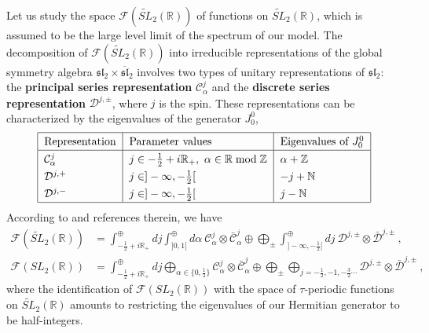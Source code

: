 \documentclass[12pt, a4paper, notitlepage, twoside]{report}
\numberwithin{equation}{section}
\theoremstyle{break}
\begin{document}
Let us study the space $\mathcal{F}(\widetilde{SL}_2(\mathbb{R}))$ of functions on $\widetilde{SL}_2(\mathbb{R})$, which is assumed to be the large level limit of the spectrum of our model. 
The decomposition of $\mathcal{F}(\widetilde{SL}_2(\mathbb{R}))$ into irreducible representations of the global symmetry algebra $\mathfrak{sl}_2\times \overline{\mathfrak{sl}}_2$ involves two types of unitary representations of $\mathfrak{sl}_2$: the \textbf{\boldmath principal series representation} $\mathcal{C}^j_\alpha$ and the \textbf{\boldmath discrete series representation} $\mathcal{D}^{j,\pm}$, where $j$ is the spin. 
These representations can be characterized by the eigenvalues of the generator $J_0^0$,
\begin{align} 
\renewcommand{\arraystretch}{1.3}
\begin{tabular}{|l|l|l|}
  \hline
Representation & Parameter values & Eigenvalues of $J_0^0$
\\
\hline 
$\mathcal{C}^j_\alpha$  & $j\in -\tfrac12+i{\mathbb{R}}_+,\ \alpha\in{\mathbb{R}}\bmod {\mathbb{Z}}$ &  $\alpha + {\mathbb{Z}}$ 
\\
$\mathcal{D}^{j,+}$ & $j\in]-\infty,-\tfrac12[$ & $-j+{\mathbb{N}}$
\\
$\mathcal{D}^{j,-}$ & $j\in]-\infty,-\tfrac12[$ & $j-{\mathbb{N}}$
\\
\hline 
 \end{tabular}
\label{rpe}
\end{align}
According to \cite{rib09} and references therein, we have
\begin{align}
 \mathcal{F}(\widetilde{SL}_2(\mathbb{R})) &= \int^\oplus_{-\frac12+i{\mathbb{R}}_+} dj \int^\oplus_{]0,1[} d\alpha\ \mathcal{C}^j_\alpha \otimes \bar{\mathcal{C}}^j_{\alpha} \oplus \bigoplus_\pm \int^\oplus_{]-\infty,-\frac12[} dj\ \mathcal{D}^{j,\pm}\otimes \bar{\mathcal{D}}^{j,\pm} \ ,
\label{fst}
\\
 \mathcal{F}(SL_2(\mathbb{R})) &= \int^\oplus_{-\frac12+i{\mathbb{R}}_+} dj \bigoplus_{\alpha\in\{0,\frac12\}} \mathcal{C}^j_\alpha \otimes \bar{\mathcal{C}}^j_{\alpha} \oplus \bigoplus_\pm \bigoplus_{j=-\frac12, -1,-\frac32 \cdots} \mathcal{D}^{j,\pm}\otimes \bar{\mathcal{D}}^{j,\pm} \ ,
\end{align}
where the identification of $\mathcal{F}(SL_2(\mathbb{R}))$ with the space of $\tau$-periodic functions on $\widetilde{SL}_2(\mathbb{R})$ amounts to restricting the eigenvalues of our Hermitian generator to be half-integers.
\end{document}
